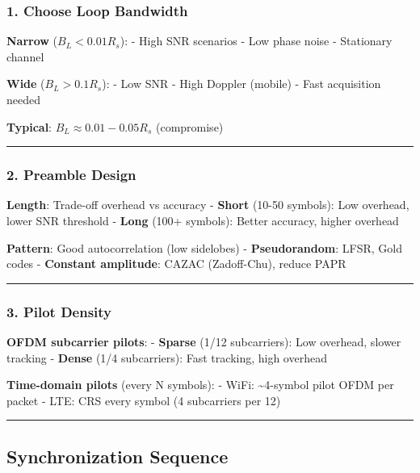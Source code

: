 \subsubsection{1. Choose Loop Bandwidth}\label{choose-loop-bandwidth}

\textbf{Narrow} (\(B_L < 0.01 R_s\)): - High SNR scenarios - Low phase
noise - Stationary channel

\textbf{Wide} (\(B_L > 0.1 R_s\)): - Low SNR - High Doppler (mobile) -
Fast acquisition needed

\textbf{Typical}: \(B_L \approx 0.01 - 0.05 R_s\) (compromise)

\begin{center}\rule{0.5\linewidth}{0.5pt}\end{center}

\subsubsection{2. Preamble Design}\label{preamble-design}

\textbf{Length}: Trade-off overhead vs accuracy - \textbf{Short} (10-50
symbols): Low overhead, lower SNR threshold - \textbf{Long} (100+
symbols): Better accuracy, higher overhead

\textbf{Pattern}: Good autocorrelation (low sidelobes) -
\textbf{Pseudorandom}: LFSR, Gold codes - \textbf{Constant amplitude}:
CAZAC (Zadoff-Chu), reduce PAPR

\begin{center}\rule{0.5\linewidth}{0.5pt}\end{center}

\subsubsection{3. Pilot Density}\label{pilot-density}

\textbf{OFDM subcarrier pilots}: - \textbf{Sparse} (1/12 subcarriers):
Low overhead, slower tracking - \textbf{Dense} (1/4 subcarriers): Fast
tracking, high overhead

\textbf{Time-domain pilots} (every N symbols): - WiFi:
\textasciitilde4-symbol pilot OFDM per packet - LTE: CRS every symbol (4
subcarriers per 12)

\begin{center}\rule{0.5\linewidth}{0.5pt}\end{center}

\subsection{Synchronization Sequence}\label{synchronization-sequence}

